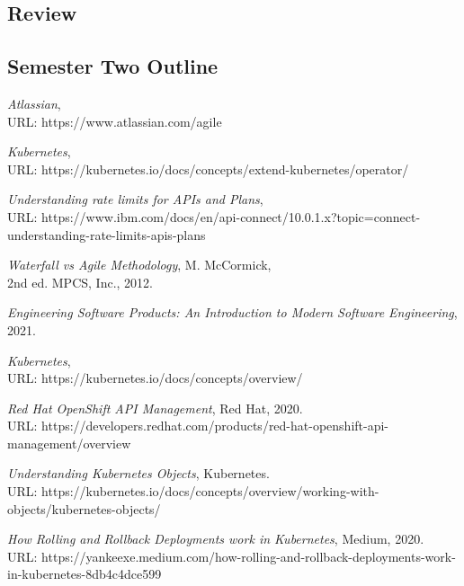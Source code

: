 \documentclass{article}
\begin{document}
\subsection{Review}



\subsection{Semester Two Outline}




\clearpage
\begin{thebibliography}{9}


\emph{Atlassian}, \\URL: https://www.atlassian.com/agile 

\emph{Kubernetes}, \\URL: https://kubernetes.io/docs/concepts/extend-kubernetes/operator/

\emph{Understanding rate limits for APIs and Plans}, \\URL: https://www.ibm.com/docs/en/api-connect/10.0.1.x?topic=connect-understanding-rate-limits-apis-plans

\emph{Waterfall vs Agile Methodology}, M. McCormick, \\2nd ed. MPCS, Inc., 2012.

\emph{Engineering Software Products: An Introduction to Modern Software Engineering}, 2021.
  
\emph{Kubernetes}, \\URL: https://kubernetes.io/docs/concepts/overview/  

\emph{Red Hat OpenShift API Management}, Red Hat, 2020. \\URL: https://developers.redhat.com/products/red-hat-openshift-api-management/overview

\emph{Understanding Kubernetes Objects}, Kubernetes. \\URL: https://kubernetes.io/docs/concepts/overview/working-with-objects/kubernetes-objects/
  
\emph{How Rolling and Rollback Deployments work in Kubernetes}, Medium, 2020. \\URL: https://yankeexe.medium.com/how-rolling-and-rollback-deployments-work-in-kubernetes-8db4c4dce599 


\end{thebibliography}
\end{document}
